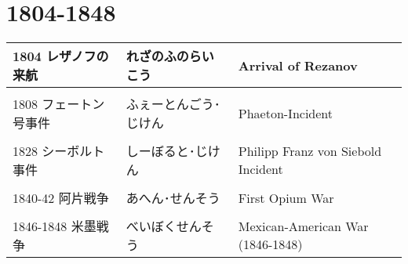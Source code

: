 \documentclass{article}
\begin{document}
\section{1804-1848}
\begin{tabular}{p{4.5cm} | p{4.5cm} | p{10.5cm}}
1804 レザノフの来航&れざのふのらいこう&Arrival of Rezanov \\ \hline \\[-1em]
1808 フェートン号事件&ふぇーとんごう･じけん&Phaeton-Incident \\ \hline \\[-1em]
1828 シーボルト事件&しーぼると･じけん&Philipp Franz von Siebold Incident \\ \hline \\[-1em]
1840-42 阿片戦争&あへん･せんそう&First Opium War \\ \hline \\[-1em]
1846-1848 米墨戦争&べいぼくせんそう&Mexican-American War (1846-1848)
\end{tabular}
\end{document}

